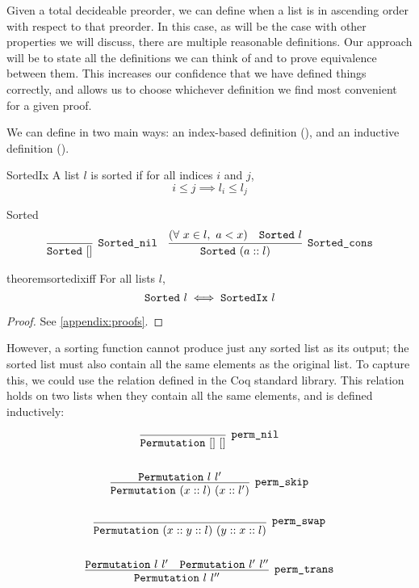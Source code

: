 \documentclass[sigplan,10pt,anonymous,review]{thesis}
\begin{document}
Given a total decideable preorder, we can define when a list is in
ascending order with respect to that preorder. In this case, as will
be the case with other properties we will discuss, there are multiple
reasonable definitions. Our approach will be to state all the
definitions we can think of and to prove equivalence between them.
This increases our confidence that we have defined things correctly,
and allows us to choose whichever definition we find most convenient
for a given proof.

We can define  in two main ways: an index-based definition
(), and an inductive definition ().
\begin{definition}{SortedIx}
  A list $l$ is sorted if for all indices $i$ and $j$,
  \begin{equation*}
    i \le j \implies l_i \le l_j
  \end{equation*}
\end{definition}

\begin{definition}{Sorted}
  \begin{align*}
    \infer[\var{Sorted\_nil}]{\var{Sorted}~[]}{}
    &&
    \infer[\var{Sorted\_cons}]{\var{Sorted}~(a :: l)}{%
      (\forall~x \in l,~a < x) & \var{Sorted}~l
    }
  \end{align*}
\end{definition}

\begin{restatable}{theorem}{sortedixiff}
  For all lists $l$,
  \begin{equation*}
    \texttt{\textup{Sorted}}~l \iff \texttt{\textup{SortedIx}}~l
  \end{equation*}
\end{restatable}
\begin{proof}
  See \cref{appendix:proofs}.
\end{proof}

However, a sorting function cannot produce just any sorted list as its
output; the sorted list must also contain all the same elements as the
original list. To capture this, we could use the 
relation defined in the Coq standard library. This relation holds on
two lists when they contain all the same elements, and is defined
inductively:
\begin{definition}[Permutation]
  \label{def:permutation}
  \begin{gather*}
    \infer[\var{perm\_nil}]{\var{Permutation}~[]~[]}{}
    \\
    \allowbreak
    \\
    \infer[\var{perm\_skip}]{\var{Permutation}~(x :: l)~(x :: l')}{%
      \var{Permutation}~l~l'
    }
    \\
    \allowbreak
    \\
    \infer[\var{perm\_swap}]{\var{Permutation}~(x :: y :: l)~(y :: x :: l)}{}
    \\
    \allowbreak
    \\
    \infer[\var{perm\_trans}]{\var{Permutation}~l~l''}{
      \var{Permutation}~l~l' & \var{Permutation}~l'~l''
    }
  \end{gather*}
\end{definition}
\end{document}
